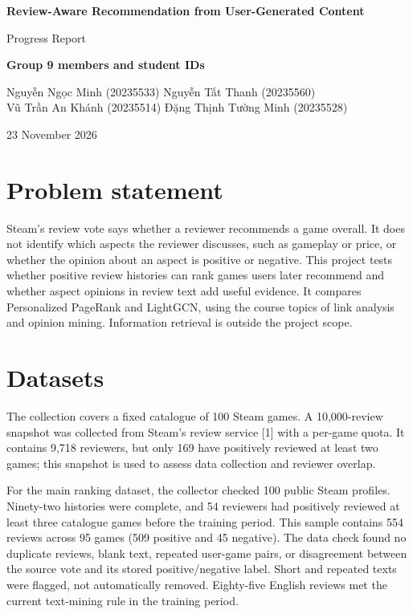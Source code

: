 \documentclass[11pt]{article}
\begin{document}
\begin{center}
{\Large\bfseries Review-Aware Recommendation from User-Generated Content\par}
\vspace{2pt}
{\large Progress Report\par}
\vspace{5pt}
{\small\textbf{Group 9 members and student IDs}\par}
{\small
Nguyễn Ngọc Minh (20235533) \quad Nguyễn Tất Thanh (20235560)\\
Vũ Trần An Khánh (20235514) \quad Đặng Thịnh Tường Minh (20235528)\par}
\vspace{4pt}
{\small 23 November 2026\par}
\end{center}

\section*{Problem statement}

Steam's review vote says whether a reviewer recommends a game overall. It does not identify which aspects the reviewer discusses, such as gameplay or price, or whether the opinion about an aspect is positive or negative. This project tests whether positive review histories can rank games users later recommend and whether aspect opinions in review text add useful evidence. It compares Personalized PageRank and LightGCN, using the course topics of link analysis and opinion mining. Information retrieval is outside the project scope.

\section*{Datasets}

The collection covers a fixed catalogue of 100 Steam games. A 10,000-review snapshot was collected from Steam's review service [1] with a per-game quota. It contains 9,718 reviewers, but only 169 have positively reviewed at least two games; this snapshot is used to assess data collection and reviewer overlap.

For the main ranking dataset, the collector checked 100 public Steam profiles. Ninety-two histories were complete, and 54 reviewers had positively reviewed at least three catalogue games before the training period. This sample contains 554 reviews across 95 games (509 positive and 45 negative). The data check found no duplicate reviews, blank text, repeated user-game pairs, or disagreement between the source vote and its stored positive/negative label. Short and repeated texts were flagged, not automatically removed. Eighty-five English reviews met the current text-mining rule in the training period.
\end{document}

